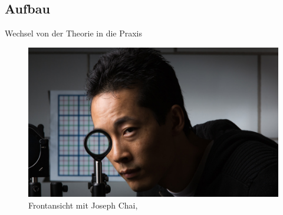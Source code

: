 \subsection{Aufbau}
\begin{frame}{Wechsel von der Theorie in die Praxis}
  \begin{figure}
    \centering
    \caption{Frontansicht mit Joseph Chai, \cite{rochester}}
    \includegraphics[height=0.8\textheight]{images/auge.jpg}
  \end{figure}
  
\end{frame}

